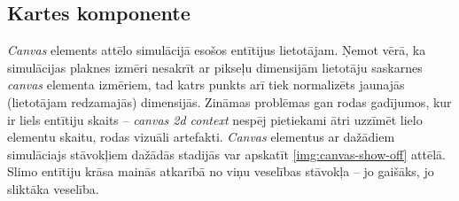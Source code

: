 \subsection{Kartes komponente}

\emph{Canvas} elements attēlo simulācijā esošos entītijus lietotājam. Ņemot vērā, ka
simulācijas plaknes izmēri nesakrīt ar pikseļu dimensijām lietotāju saskarnes
\emph{canvas} elementa izmēriem, tad katrs punkts arī tiek normalizēts jaunajās
(lietotājam redzamajās) dimensijās. Zināmas problēmas gan rodas gadījumos, kur
ir liels entītiju skaits -- \emph{canvas 2d context} nespēj pietiekami ātri
uzzīmēt lielo elementu skaitu, rodas vizuāli artefakti. \emph{Canvas} elementus
ar dažādiem simulāciajs stāvokļiem dažādās stadijās var apskatīt \ref{img:canvas-show-off} attēlā.
Slimo entītiju krāsa mainās atkarībā no viņu veselības stāvokļa -- jo gaišāks, jo sliktāka veselība.

